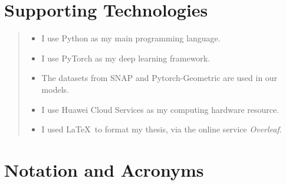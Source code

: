 \documentclass[ %
                    author={Tengyao Tu},
                supervisor={Dr. James Pope},
                    degree={MSc},
                     title={A New Perspective on Graph Community Detection: Combining Traditional Methods with Deep Learning Approaches},
                  subtitle={Applying to Telecom Networks and Diverse Datasets},
                      type={},
                      year={2024}]{dissertation}
\begin{document}
\chapter*{Supporting Technologies}
\begin{quote}
\noindent
\begin{itemize}

\item I use Python as my main programming language.
\item I use PyTorch as my deep learning framework.
\item The datasets from SNAP and Pytorch-Geometric are used in our models.
\item I use Huawei Cloud Services as my computing hardware resource.
\item I used \LaTeX\ to format my thesis, via the online service {\em Overleaf}. 
\end{itemize}
\end{quote}


\chapter*{Notation and Acronyms}
\end{document}
